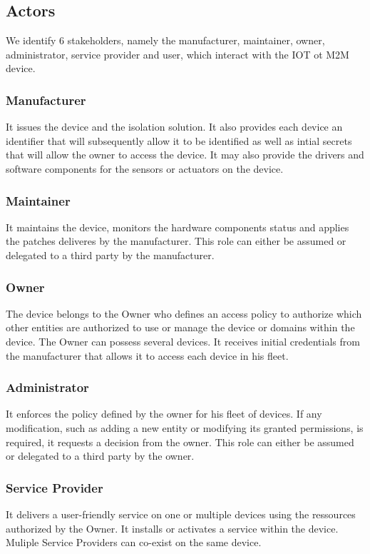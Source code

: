 \documentclass[conference]{IEEEtran}
\begin{document}
\subsection{Actors}
\label{sec:Actors}
We identify 6 stakeholders, namely the manufacturer, maintainer, owner, administrator, service provider and user, which interact with the IOT ot M2M device.
\subsubsection{Manufacturer}
It issues the device and the isolation solution. It also provides each device an identifier that will subsequently allow it to be identified as well as intial secrets that will allow the owner to access the device. It may also provide the drivers and software components for the sensors or actuators on the device. 
\subsubsection{Maintainer}
It maintains the device, monitors the hardware components status and applies the patches deliveres by the manufacturer. This role can either be assumed or delegated to a third party by the manufacturer. 
\subsubsection{Owner}
The device belongs to the Owner who defines an access policy to authorize which other entities are authorized to use or manage the device or domains within the device. The Owner can possess several devices. It receives initial credentials from the manufacturer that allows it to access each device in his fleet. 
\subsubsection{Administrator}
It enforces the policy defined by the owner for his fleet of devices. If any modification, such as adding a new entity or modifying its granted permissions,  is required, it requests a decision from the owner. This role can either be assumed or delegated to a third party by the owner. 
\subsubsection{Service Provider}
It delivers a user-friendly service on one or multiple devices using the ressources authorized by the Owner. It installs or activates a service within the device. Muliple Service Providers can co-exist on the same device. 
\end{document}
